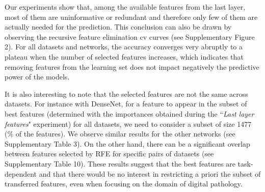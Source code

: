 Our experiments show that, among the available features from the last layer, most of them are uninformative or redundant and therefore only few of them are actually needed for the prediction. This conclusion can also be drawn by observing the recursive feature elimination \acrlong{cv} curves (see Supplementary Figure 2). For all datasets and networks, the accuracy converges very abruptly to a plateau when the number of selected features increases, which indicates that removing features from the learning set does not impact negatively the predictive power of the models.

It is also interesting to note that the selected features are not the same across datasets. For instance with DenseNet, for a feature to appear in the subset of best features (determined with the importances obtained during the ``\textit{Last layer features}" experiment) for all datasets, we need to consider a subset of size 1477 (\% of the features). We observe similar results for the other networks (see Supplementary Table 3). On the other hand, there can be a significant overlap between features selected by RFE for specific pairs of datasets (see Supplementary Table 10). These results suggest that the best features are task-dependent and that there would be no interest in restricting a priori the subset of transferred features, even when focusing on the domain of digital pathology.
 
 
 
